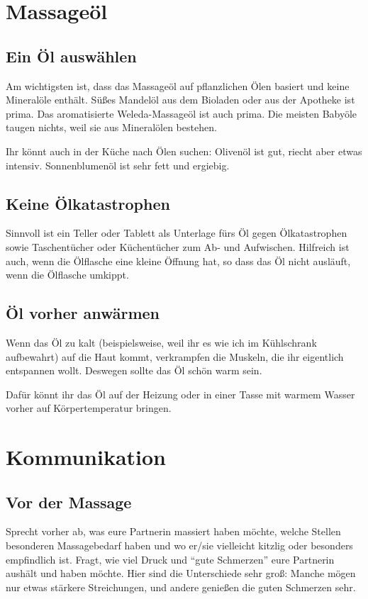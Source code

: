 \section{Massageöl}

\subsection{Ein Öl auswählen}

Am wichtigsten ist, dass das Massageöl auf pflanzlichen Ölen basiert und keine Mineralöle enthält. Süßes Mandelöl aus dem Bioladen oder aus der Apotheke ist prima. Das aromatisierte Weleda-Massageöl ist auch prima. Die meisten Babyöle taugen nichts, weil sie aus Mineralölen bestehen.

Ihr könnt auch in der Küche nach Ölen suchen: Olivenöl ist gut, riecht aber etwas intensiv. Sonnenblumenöl ist sehr fett und ergiebig.

\subsection{Keine Ölkatastrophen}

Sinnvoll ist ein Teller oder Tablett als Unterlage fürs Öl gegen Ölkatastrophen sowie Taschentücher oder Küchentücher zum Ab- und Aufwischen. Hilfreich ist auch, wenn die Ölflasche eine kleine Öffnung hat, so dass das Öl nicht ausläuft, wenn die Ölflasche umkippt.

\subsection{Öl vorher anwärmen}

Wenn das Öl zu kalt (beispielsweise, weil ihr es wie ich im Kühlschrank aufbewahrt) auf die Haut kommt, verkrampfen die Muskeln, die ihr eigentlich entspannen wollt. Deswegen sollte das Öl schön warm sein.

Dafür könnt ihr das Öl auf der Heizung oder in einer Tasse mit warmem Wasser vorher auf Körpertemperatur bringen.


\section{Kommunikation}

\subsection{Vor der Massage}

Sprecht vorher ab, was eure Partnerin massiert haben möchte, welche Stellen besonderen Massagebedarf haben und wo er/sie vielleicht kitzlig oder besonders empfindlich ist. Fragt, wie viel Druck und ``gute Schmerzen'' eure Partnerin aushält und haben möchte. Hier sind die Unterschiede sehr groß: Manche mögen nur etwas stärkere Streichungen, und andere genießen die guten Schmerzen sehr.

